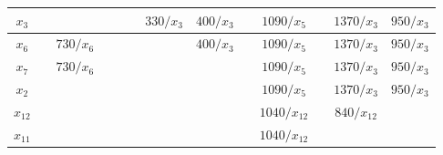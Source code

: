 \documentclass[12pt]{article}
\begin{document}
\begin{enumerate}
{\begin{tabular}{|c|c|c|c|c|c|c|c|c|c|c|c|c|}
$x_3$    & {\color[HTML]{000000} }           &                                  & \textbf{}                        &                                  &                                     & {\color[HTML]{FE0000} $330/x_3$} & $400/x_3$                        &                                  & $1090/x_5$                           &                                  & $1370/x_3$                          & $950/x_3$                        \\ \hline
$x_6$    &                                   & $730/x_6$                        &                                  &                                  &                                     &                                  & {\color[HTML]{CB0000} $400/x_3$} &                                  & {\color[HTML]{000000} $1090/x_5$}    &                                  & $1370/x_3$                          & $950/x_3$                        \\ \hline
$x_7$    & {\color[HTML]{FE0000} }           & {\color[HTML]{FE0000} $730/x_6$} &                                  &                                  &                                     & {\color[HTML]{FE0000} }          & \textbf{}                        &                                  & $1090/x_5$                           &                                  & $1370/x_3$                          & $950/x_3$                        \\ \hline
$x_2$    &                                   & {\color[HTML]{FE0000} }          &                                  &                                  &                                     &                                  &                                  &                                  & $1090/x_5$                           &                                  & $1370/x_3$                          & {\color[HTML]{FE0000} $950/x_3$} \\ \hline
$x_{12}$ &                                   &                                  &                                  &                                  &                                     &                                  &                                  & \textbf{}                        & {\color[HTML]{000000} $1040/x_{12}$} &                                  & {\color[HTML]{FE0000} $840/x_{12}$} & {\color[HTML]{FE0000} }          \\ \hline
$x_{11}$ &                                   &                                  &                                  &                                  &                                     &                                  &                                  &                                  & {\color[HTML]{FE0000} $1040/x_{12}$} &                                  & {\color[HTML]{FE0000} }             &                                  \\ \hline

\end{tabular}}
\end{enumerate}
\end{document}
